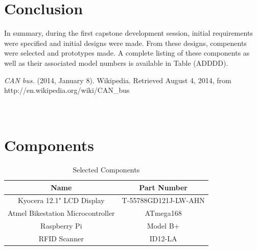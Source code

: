 \documentclass[11pt,a4paper,onesides]{report}
\begin{document}
\section*{Conclusion}

    In summary, during the first capstone development session, initial requirements were specified and initial designs were made.  From these designs, compenents were selected and prototypes made.  A complete listing of these components as well as their associated model numbers is available in Table (ADDDD).



\begin{thebibliography}{10}

 \emph{CAN bus.} (2014, January 8). Wikipedia. Retrieved August 4, 2014, from http://en.wikipedia.org/wiki/CAN\_bus

\end{thebibliography}


\newpage

\section*{\\Components} \label{app:parts}

\begin{table}[ht]
\caption{Selected Components} %
\centering %
\begin{tabular}{c c} %
\hline\hline %
Name & Part Number \\[0.5ex] %
\hline %
Kyocera 12.1" LCD Display & T-55788GD121J-LW-AHN  \\ %
Atmel Bikestation Microcontroller & ATmega168 \\
Raspberry Pi & Model B+\\
RFID Scanner & ID12-LA \\
 [1ex] %
\hline %
\end{tabular}
\label{table:parts} %
\end{table}
\end{document}
